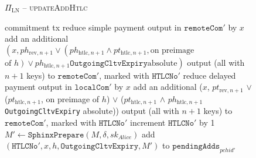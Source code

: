 \begin{figure}[H]
\begin{protocolbox}{$\Pi_{\mathrm{LN}}$ -- \textsc{updateAddHtlc}}
\begin{algorithmic}[1]
            commitment tx
            \State reduce simple payment output in $\mathtt{remoteCom}'$ by $x$
            \State add an additional $\left(x, ph_{\mathrm{rev}, n+1} \vee
            \left(ph_{\mathrm{htlc}, n+1} \wedge pt_{\mathrm{htlc}, n+1}, \text{
            on preimage}\right.\right.$ $\left.\left.\text{of } h\right) \vee
            ph_{\mathrm{htlc}, n+1}\mathtt{OutgoingCltvExpiry} \text{
            absolute}\right)$ output (all with $n+1$ keys) to
            $\mathtt{remoteCom}'$, marked with $\texttt{HTLCNo}'$
            \State reduce delayed payment output in $\mathtt{localCom}'$ by $x$
            \State add an additional ($x$, $pt_{\mathrm{rev}, n+1}$ $\vee$
            ($pt_{\mathrm{htlc}, n+1}$, on preimage of $h$) $\vee$
            ($pt_{\mathrm{htlc}, n+1}$ $\wedge$ $ph_{\mathrm{htlc}, n+1}$
            \texttt{OutgoingCltvExpiry} absolute)) output (all with $n+1$ keys)
            to $\mathtt{remoteCom}'$, marked with $\texttt{HTLCNo}'$
            \State increment $\texttt{HTLCNo}'$ by 1
            \State $M' \gets \mathtt{SphinxPrepare}\left(M, \delta,
            sk_{\mathit{Alice}}\right)$
            \State add $\left(\mathtt{HTLCNo}', x, h,
            \mathtt{OutgoingCltvExpiry}, M'\right)$ to
            $\mathtt{pendingAdds}_{\mathit{pchid}'}$
          \EndIf
        \EndIndent
      \end{algorithmic}
    \end{protocolbox}
    \caption{}
    \label{alg:protocol:pay:updateAddHtlc}
  \end{figure}

